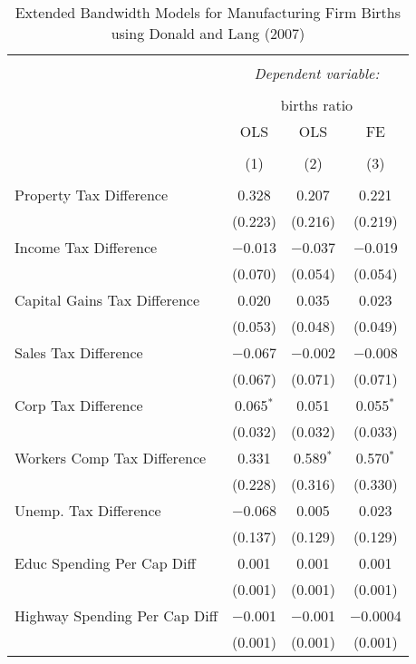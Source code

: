 
\begin{table}[!htbp] \centering 
  \caption{Extended Bandwidth Models for  Manufacturing Firm Births using Donald and Lang (2007)} 
  \label{} 
\begin{tabular}{@{\extracolsep{5pt}}lccc} 
\\[-1.8ex]\hline 
\hline \\[-1.8ex] 
 & \multicolumn{3}{c}{\textit{Dependent variable:}} \\ 
\cline{2-4} 
\\[-1.8ex] & \multicolumn{3}{c}{births ratio} \\ 
 & OLS & OLS & FE \\ 
\\[-1.8ex] & (1) & (2) & (3)\\ 
\hline \\[-1.8ex] 
 Property Tax Difference & 0.328 & 0.207 & 0.221 \\ 
  & (0.223) & (0.216) & (0.219) \\ 
  Income Tax Difference & $-$0.013 & $-$0.037 & $-$0.019 \\ 
  & (0.070) & (0.054) & (0.054) \\ 
  Capital Gains Tax Difference & 0.020 & 0.035 & 0.023 \\ 
  & (0.053) & (0.048) & (0.049) \\ 
  Sales Tax Difference & $-$0.067 & $-$0.002 & $-$0.008 \\ 
  & (0.067) & (0.071) & (0.071) \\ 
  Corp Tax Difference & 0.065$^{*}$ & 0.051 & 0.055$^{*}$ \\ 
  & (0.032) & (0.032) & (0.033) \\ 
  Workers Comp Tax Difference & 0.331 & 0.589$^{*}$ & 0.570$^{*}$ \\ 
  & (0.228) & (0.316) & (0.330) \\ 
  Unemp. Tax Difference & $-$0.068 & 0.005 & 0.023 \\ 
  & (0.137) & (0.129) & (0.129) \\ 
  Educ Spending Per Cap Diff & 0.001 & 0.001 & 0.001 \\ 
  & (0.001) & (0.001) & (0.001) \\ 
  Highway Spending Per Cap Diff & $-$0.001 & $-$0.001 & $-$0.0004 \\ 
  & (0.001) & (0.001) & (0.001) \\ 

\end{tabular}
\end{table}
